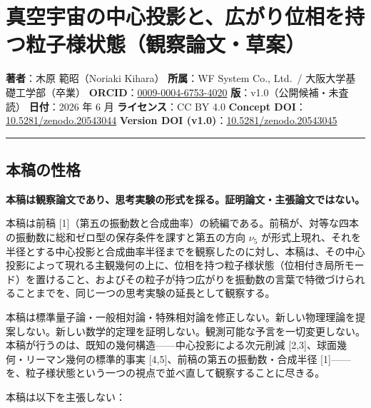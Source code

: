 \documentclass[
]{ltjsarticle}
\author{}
\date{}
\begin{document}
\section{真空宇宙の中心投影と、広がり位相を持つ粒子様状態（観察論文・草案）}\label{ux771fux7a7aux5b87ux5b99ux306eux4e2dux5fc3ux6295ux5f71ux3068ux5e83ux304cux308aux4f4dux76f8ux3092ux6301ux3064ux7c92ux5b50ux69d8ux72b6ux614bux89b3ux5bdfux8ad6ux6587ux8349ux6848}

\textbf{著者}：木原 範昭（Noriaki Kihara） \textbf{所属}：WF System Co.,
Ltd.~/ 大阪大学基礎工学部（卒業）
\textbf{ORCID}：\href{https://orcid.org/0009-0004-6753-4020}{0009-0004-6753-4020}
\textbf{版}：v1.0（公開候補・未査読） \textbf{日付}：2026 年 6 月
\textbf{ライセンス}：CC BY 4.0 \textbf{Concept
DOI}：\href{https://doi.org/10.5281/zenodo.20543044}{10.5281/zenodo.20543044}
\textbf{Version DOI
(v1.0)}：\href{https://doi.org/10.5281/zenodo.20543045}{10.5281/zenodo.20543045}

\begin{center}\rule{0.5\linewidth}{0.5pt}\end{center}

\subsection{本稿の性格}\label{ux672cux7a3fux306eux6027ux683c}

\textbf{本稿は観察論文であり、思考実験の形式を採る。証明論文・主張論文ではない。}

本稿は前稿
{[}1{]}（第五の振動数と合成曲率）の続編である。前稿が、対等な四本の振動数に総和ゼロ型の保存条件を課すと第五の方向
\(\nu_5\)
が形式上現れ、それを半径とする中心投影と合成曲率半径までを観察したのに対し、本稿は、その中心投影によって現れる主観幾何の上に、位相を持つ粒子様状態（位相付き局所モード）を置けること、およびその粒子が持つ広がりを振動数の言葉で特徴づけられることまでを、同じ一つの思考実験の延長として観察する。

本稿は標準量子論・一般相対論・特殊相対論を修正しない。新しい物理理論を提案しない。新しい数学的定理を証明しない。観測可能な予言を一切変更しない。本稿が行うのは、既知の幾何構造------中心投影による次元削減
{[}2,3{]}、球面幾何・リーマン幾何の標準的事実
{[}4,5{]}、前稿の第五の振動数・合成半径
{[}1{]}------を、粒子様状態という一つの視点で並べ直して観察することに尽きる。

本稿は以下を主張しない：
\end{document}
